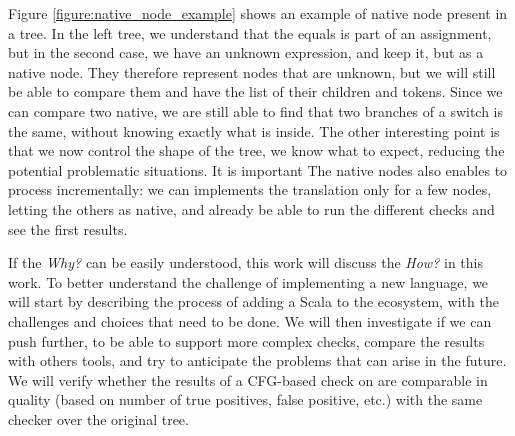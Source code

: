 Figure \ref{figure:native_node_example} shows an example of native node present in a \slang tree. In the left tree, we understand that the equals is part of an assignment, but in the second case, we have an unknown expression, and keep it, but as a native node.
They therefore represent nodes that are unknown, but we will still be able to compare them and have the list of their children and tokens. 
Since we can compare two native, we are still able to find that two branches of a switch is the same, without knowing exactly what is inside. 
The other interesting point is that we now control the shape of the tree, we know what to expect, reducing the potential problematic situations.
It is important The native nodes also enables to process incrementally: we can implements the translation only for a few nodes, letting the others as native, and already be able to run the different checks and see the first results.


If the \emph{Why?} can be easily understood, this work will discuss the \emph{How?} in this work. 
To better understand the challenge of implementing a new language, we will start by describing the process of adding a Scala to the ecosystem, with the challenges and choices that need to be done. 
We will then investigate if we can push \slang further, to be able to support more complex checks, compare the results with others tools, and try to anticipate the problems that can arise in the future.
We will verify whether the results of a CFG-based check on \slang are comparable in quality (based on number of true positives, false positive, etc.) with the same checker over the original tree.





